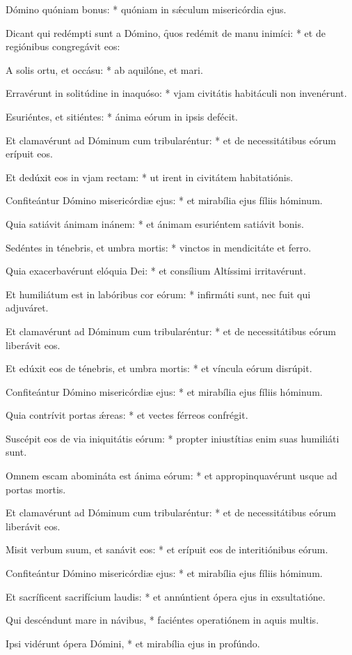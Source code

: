 \begin{psalmus}

 Dómino quóniam bonus: * quóniam in sǽculum misericórdia ejus.

Dicant qui redémpti sunt a Dómino, \f quos redémit de manu inimíci: * et de regiónibus congregávit eos:

A solis ortu, et occásu: * ab aquilóne, et mari.

Erravérunt in solitúdine in inaquóso: * vjam civitátis habitáculi non invenérunt.

Esuriéntes, et sitiéntes: * ánima eórum in ipsis defécit.

Et clamavérunt ad Dóminum cum tribularéntur: * et de necessitátibus eórum erípuit eos.

Et dedúxit eos in vjam rectam: * ut irent in civitátem habitatiónis.

Confiteántur Dómino misericórdiæ ejus: * et mirabília ejus fíliis hóminum.

Quia satiávit ánimam inánem: * et ánimam esuriéntem satiávit bonis.

Sedéntes in ténebris, et umbra mortis: * vinctos in mendicitáte et ferro.

Quia exacerbavérunt elóquia Dei: * et consílium Altíssimi irritavérunt.

Et humiliátum est in labóribus cor eórum: * infirmáti sunt, nec fuit qui adjuváret.

Et clamavérunt ad Dóminum cum tribularéntur: * et de necessitátibus eórum liberávit eos.

Et edúxit eos de ténebris, et umbra mortis: * et víncula eórum disrúpit.

Confiteántur Dómino misericórdiæ ejus: * et mirabília ejus fíliis hóminum.

Quia contrívit portas ǽreas: * et vectes férreos confrégit.

Suscépit eos de via iniquitátis eórum: * propter iniustítias enim suas humiliáti sunt.

Omnem escam abomináta est ánima eórum: * et appropinquavérunt usque ad portas mortis.

Et clamavérunt ad Dóminum cum tribularéntur: * et de necessitátibus eórum liberávit eos.

Misit verbum suum, et sanávit eos: * et erípuit eos de interitiónibus eórum.

Confiteántur Dómino misericórdiæ ejus: * et mirabília ejus fíliis hóminum.

Et sacríficent sacrifícium laudis: * et annúntient ópera ejus in exsultatióne.

Qui descéndunt mare in návibus, * faciéntes operatiónem in aquis multis.

Ipsi vidérunt ópera Dómini, * et mirabília ejus in profúndo.

\end{psalmus}
